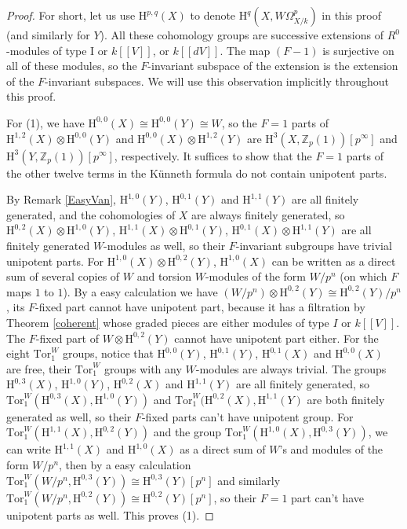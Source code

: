 \documentclass[a4paper,12pt,twoside]{report}
\newcommand{\Z}{\mathbb{Z}}
\newcommand{\HH}{\mathrm{H}}
\newcommand{\Tor}{\mathrm{Tor}}
\begin{document}
\begin{proof} For short, let us use $\HH^{p,q}(X)$ to denote $\HH^q(X,W\Omega^p_{X/k})$ in this proof
(and similarly for $Y$). 
All these cohomology groups are successive extensions of 
$R^0$-modules of type I or $k[[V]]$, or $k[[dV]]$. 
The map $(F-1)$ is surjective on all of these modules, 
so the $F$-invariant subspace of the extension is the extension of the $F$-invariant subspaces. 
We will use this observation implicitly throughout this proof. 

For (1), we have $\HH^{0,0}(X)\cong \HH^{0,0}(Y)\cong W$, 
so the $F=1$ parts of $\HH^{1,2}(X) \otimes \HH^{0,0}(Y)$ and $\HH^{0,0}(X)\otimes \HH^{1,2}(Y)$ 
are $\HH^3(X,\Z_p(1))[p^\infty]$ and $\HH^3(Y,\Z_p(1))[p^\infty]$, respectively. 
It suffices to show that the $F=1$ parts of the other twelve terms in the K\"unneth formula do not contain unipotent parts. 

By Remark \ref{EasyVan}, $\HH^{1,0}(Y)$, $\HH^{0,1}(Y)$ and $\HH^{1,1}(Y)$ are all finitely generated, 
and the cohomologies of $X$ are always finitely generated,
so $\HH^{0,2}(X)\otimes \HH^{1,0}(Y)$, $\HH^{1,1}(X)\otimes \HH^{0,1}(Y)$, $\HH^{0,1}(X)\otimes \HH^{1,1}(Y)$
are all finitely generated $W$-modules as well, so their $F$-invariant subgroups have trivial unipotent parts. 
For $\HH^{1,0}(X)\otimes \HH^{0,2}(Y)$, 
$\HH^{1,0}(X)$ can be written as a direct sum of several copies of $W$ and torsion $W$-modules of the form $W/p^n$ (on which $F$ maps $1$ to $1$).   
By a easy calculation we have $(W/p^n)\otimes \HH^{0,2}(Y)\cong \HH^{0,2}(Y)/p^n$, 
its $F$-fixed part cannot have unipotent part, because it has a filtration by Theorem \ref{coherent} whose graded pieces are either modules of type $I$ or $k[[V]]$. 
The  $F$-fixed part of $W\otimes \HH^{0,2}(Y)$ cannot have unipotent part either.
For the eight $\Tor_1^W$ groups, notice that $\HH^{0,0}(Y)$, $\HH^{0,1}(Y)$, $\HH^{0,1}(X)$ and $\HH^{0,0}(X)$ are free, 
their $\Tor_1^W$ groups with any $W$-modules are always trivial. 
The groups $\HH^{0,3}(X)$, $\HH^{1,0}(Y)$, $\HH^{0,2}(X)$ and $\HH^{1,1}(Y)$ are all finitely generated, 
so $\Tor_1^W(\HH^{0,3}(X),\HH^{1,0}(Y))$ and $\Tor_1^W(\HH^{0,2}(X),\HH^{1,1}(Y)$ are both finitely generated as well, 
so their $F$-fixed parts can't have unipotent group. 
For $\Tor_1^W(\HH^{1,1}(X),\HH^{0,2}(Y))$ and the group $\Tor_1^W(\HH^{1,0}(X),\HH^{0,3}(Y))$, 
we can write $\HH^{1,1}(X)$ and $\HH^{1,0}(X)$ as a direct sum of $W$'s and modules of the form $W/p^n$, 
then by a easy calculation $\Tor_1^W(W/p^n, \HH^{0,3}(Y))\cong \HH^{0,3}(Y)[p^n]$ and similarly 
$\Tor_1^W(W/p^n, \HH^{0,2}(Y))\cong \HH^{0,2}(Y)[p^n]$, so their $F=1$ part can't have unipotent parts as well. This proves (1). 


\end{proof}
\end{document}
